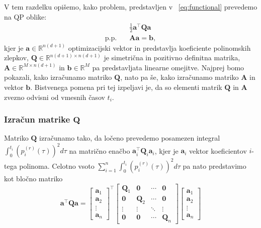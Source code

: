 \documentclass[mat2, tisk]{fmfdelo}
\begin{document}
V tem razdelku opišemo, kako problem, predstavljen v ~\eqref{eq:functional} prevedemo na \ac{QP} oblike:
\begin{equation}
    \begin{aligned}
        &\frac{1}{2}\mathbf{a}^\top \mathbf{Q} \mathbf{a}\\
        \text{p.p.}\quad & \mathbf{A}\mathbf{a} = \mathbf{b},
    \end{aligned}
\end{equation}
kjer je $\mathbf{a} \in \mathbb{R}^{n (d+1)}$ optimizacijski vektor in predstavlja koeficiente polinomskih zlepkov, $\mathbf{Q} \in \mathbb{R}^{n(d+1) \times n(d+1)}$ je simetrična in pozitivno definitna matrika, $\mathbf{A} \in \mathbb{R}^{M \times n(d+1)}$ in $\mathbf{b} \in \mathbb{R}^M$ pa predstavljata linearne omejitve. Najprej bomo pokazali, kako izračunamo matriko $\mathbf{Q}$, nato pa še, kako izračunamo matriko $\mathbf{A}$ in vektor $\mathbf{b}$. Bistvenega pomena pri tej izpeljavi je, da so elementi matrik $\mathbf{Q}$ in $\mathbf{A}$ zvezno odvisni od vmesnih časov $t_i$.

\subsubsection{Izračun matrike $\mathbf{Q}$}
Matriko $\mathbf{Q}$ izračunamo tako, da ločeno prevedemo posamezen integral $\int_0^{t_i} (p_i^{(r)}(\tau))^2 d\tau$ na matrično enačbo $\mathbf{a}_i^\top \mathbf{Q}_i \mathbf{a}_i$, kjer je $\mathbf{a}_i$ vektor koeficientov $i$-tega polinoma. Celotno vsoto $\sum_{i=1}^n \int_0^{t_i} (p_i^{(r)}(\tau))^2 d\tau$ pa nato predstavimo kot bločno matriko
\begin{equation}
\label{eq:cost_function_matrix}
    \mathbf{a}^\top \mathbf{Q} \mathbf{a} = 
    \begin{bmatrix}
        \mathbf{a}_1 \\ \mathbf{a}_2 \\ \vdots \\ \mathbf{a}_n 
    \end{bmatrix}^\top
    \begin{bmatrix}
        \mathbf{Q}_1 & \mathbf{0} & \cdots & \mathbf{0} \\
        \mathbf{0} & \mathbf{Q}_2 & \cdots & \mathbf{0} \\
        \vdots & \vdots & \ddots & \vdots \\
        \mathbf{0} & \mathbf{0} & \cdots & \mathbf{Q}_n
    \end{bmatrix}
    \begin{bmatrix}
        \mathbf{a}_1 \\ \mathbf{a}_2 \\ \vdots \\ \mathbf{a}_n 
    \end{bmatrix}
\end{equation}
\end{document}

